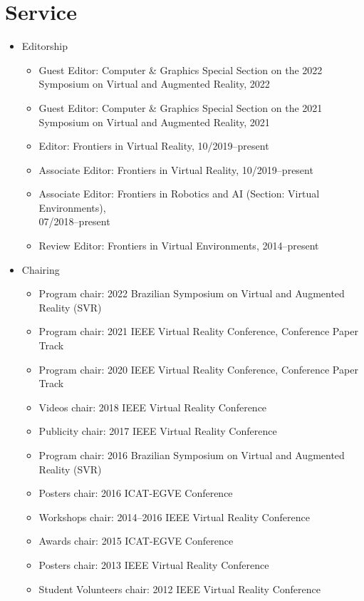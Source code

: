 \documentclass[wideaddress]{vitae}
\begin{document}
\section{Service}
\begin{itemize}
	\item{Editorship}
		\begin{itemize}
			\item{Guest Editor: Computer \& Graphics Special Section on the 2022 Symposium on Virtual and Augmented Reality, 2022}
                \item{Guest Editor: Computer \& Graphics Special Section on the 2021 Symposium on Virtual and Augmented Reality, 2021}
			\item{Editor: Frontiers in Virtual Reality, 10/2019--present}
			\item{Associate Editor: Frontiers in Virtual Reality, 10/2019--present}
			\item{Associate Editor: Frontiers in Robotics and AI (Section: Virtual Environments),\\07/2018--present}
			\item{Review Editor: Frontiers in Virtual Environments, 2014--present}
		\end{itemize}
	\item{Chairing}
		\begin{itemize}
			\item{Program chair: 2022 Brazilian Symposium on Virtual and Augmented Reality (SVR)}
			\item{Program chair: 2021 IEEE Virtual Reality Conference, Conference Paper Track}
			\item{Program chair: 2020 IEEE Virtual Reality Conference, Conference Paper Track}
			\item{Videos chair: 2018 IEEE Virtual Reality Conference}
			\item{Publicity chair: 2017 IEEE Virtual Reality Conference}
			\item{Program chair: 2016 Brazilian Symposium on Virtual and Augmented Reality (SVR)}
			\item{Posters chair: 2016 ICAT-EGVE Conference}
			\item{Workshops chair: 2014--2016 IEEE Virtual Reality Conference}
			\item{Awards chair: 2015 ICAT-EGVE Conference}
			\item{Posters chair: 2013 IEEE Virtual Reality Conference}
			\item{Student Volunteers chair: 2012 IEEE Virtual Reality Conference}

\end{itemize}
\end{itemize}
\end{document}
